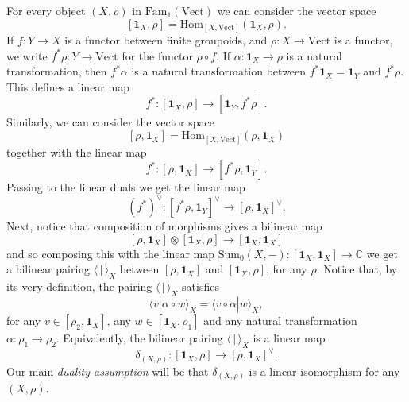 \documentclass[12pt]{scrartcl}
\theoremstyle{definition}
\numberwithin{equation}{section}
\numberwithin{definition}{section}
\numberwithin{figure}{section}
\begin{document}
For every object $(X,\rho)$ in $\mathrm{Fam}_1(\mathrm{Vect})$ we can consider the vector space 
\[
[\mathbf{1}_X,\rho]=\mathrm{Hom}_{[X,\mathrm{Vect}]}(\mathbf{1}_X,\rho).
\]
If $f\colon Y\to X$ is a functor between finite groupoids, and $\rho\colon X\to \mathrm{Vect}$ is a functor, we write $f^*\rho\colon Y\to \mathrm{Vect}$ for the functor $\rho\circ f$. If $\alpha\colon \mathbf{1}_X\to \rho$ is a natural transformation, then $f^*\alpha$ is a natural transformation between $f^*\mathbf{1}_X=\mathbf{1}_Y$ and $f^*\rho$. This defines a linear map
\[
f^* \colon [\mathbf{1}_X,\rho] \to [\mathbf{1}_Y, f^*\rho].
\]
Similarly, we can consider the vector space
\[
[\rho,\mathbf{1}_X]=\mathrm{Hom}_{[X,\mathrm{Vect}]}(\rho, \mathbf{1}_X)
\]
together with the linear map 
\[
f^* \colon [\rho,\mathbf{1}_X] \to [f^*\rho,\mathbf{1}_Y].
\]
Passing to the linear duals we get the linear map
\[
(f^*)^\vee\colon [f^*\rho,\mathbf{1}_Y]^\vee \to [\rho,\mathbf{1}_X]^\vee.
\]
Next, notice that composition of morphisms gives a bilinear map
\[
[\rho,\mathbf{1}_X]\otimes [\mathbf{1}_X,\rho] \to [\mathbf{1}_X,\mathbf{1}_X]
\]
and so composing this with the linear map $\mathrm{Sum}_0(X,-)\colon [\mathbf{1}_X,\mathbf{1}_X]\to \mathbb{C}$ we get a bilinear pairing $\langle\,|\,\rangle_X$ between $[\rho,\mathbf{1}_X]$ and $[\mathbf{1}_X,\rho]$, for any $\rho$. Notice that, by its very definition, the pairing $\langle\,|\,\rangle_X$ satisfies
\[
\langle v|\alpha\circ w\rangle_X =\langle  v\circ \alpha|w \rangle_X,
\]
for any $v\in [\rho_2,\mathbf{1}_X]$, any $w\in [\mathbf{1}_X,\rho_1]$ and any natural transformation $\alpha\colon \rho_1\to \rho_2$.
Equivalently, the bilinear pairing $\langle\,|\,\rangle_X$ is a linear map
\[
\delta_{(X,\rho)}\colon [\mathbf{1}_X,\rho]\to [\rho,\mathbf{1}_X]^\vee.
\]
Our main \textsl{duality assumption} will be that $\delta_{(X,\rho)}$ is a linear isomorphism for any $(X,\rho)$. 
\end{document}
